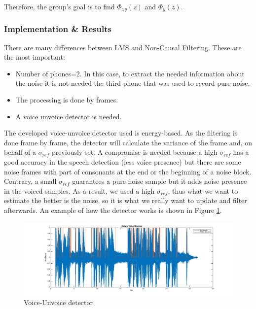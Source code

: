 \documentclass[11pt,a4paper,english]{book}  %
\theoremstyle{definition}  %
\theoremstyle{plain}  %
\theoremstyle{remark}  %
\begin{document}
	Therefore, the group's goal is to find $\Phi_{xy}(z)$ and $\Phi_{y}(z)$.
	
	
	\subsubsection{Implementation \& Results}
	
		There are many differences between LMS and Non-Causal Filtering. These are the most important:
		
		\begin{itemize}
		\item Number of phones=2. In this case, to extract the needed information about the noise it is not needed the third phone that was used to record pure noise.
		
		\item The processing is done by frames.
		
		\item A voice unvoice detector is needed.
		\end{itemize}
		
		The developed voice-unvoice detector used is energy-based. As the filtering is done frame by frame, the detector will calculate the variance of the frame and, on behalf of a $\sigma_{ref}$ previously set. A compromise is needed because a high $\sigma_{ref}$ has a good accuracy in the speech detection (less voice presence) but there are some noise frames with part of consonants at the end or the beginning of a noise block. Contrary, a small $\sigma_{ref}$ guarantees a pure noise sample but it adds noise presence in the voiced samples. As a result, we used a high $\sigma_{ref}$, thus what we want to estimate the better is the noise, so it is what we really want to update and filter afterwards.  An example of how the detector works is shown in Figure \ref{fig:detector}.
		
		\begin{figure}[h]
		\centering
		\includegraphics[width=15cm]{images/theory/highsigma.jpg}
		\caption{Voice-Unvoice detector}
		\label{fig:detector}
		\end{figure}
		
\end{document}
